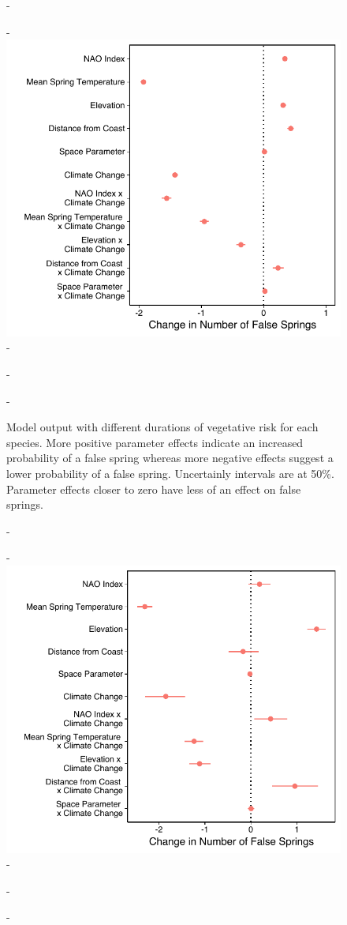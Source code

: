 \documentclass{article}\usepackage[]{graphicx}\usepackage[]{color}
\begin{document}
  {\begin{figure} [H]
  -\begin{center}
  -\includegraphics[width=16cm]{..//figures/model_output_dvr.pdf}
  -\caption{Model output with different durations of vegetative risk for each species. More positive parameter effects indicate an increased probability of a false spring whereas more negative effects suggest a lower probability of a false spring. Uncertainly intervals are at 50\%. Parameter effects closer to zero have less of an effect on false springs.}\label{fig:five}
  -\end{center}
  -\end{figure}}


{\begin{figure} [H]
  -\begin{center}
  -\includegraphics[width=16cm]{..//figures/model_output_berniefive.pdf}
  -\caption{}\label{fig:five}
  -\end{center}
  -\end{figure}}
  
\end{document}
